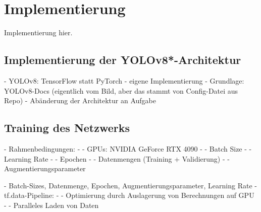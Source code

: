 
\section{Implementierung}
\label{sec:ki:implementierung}

Implementierung hier.


\subsection{Implementierung der YOLOv8*-Architektur}
\label{sec:yolov8_implementierung}

- YOLOv8: TensorFlow statt PyTorch
- eigene Implementierung
- Grundlage: YOLOv8-Docs (eigentlich vom Bild, aber das stammt von Config-Datei aus Repo)
- Abänderung der Architektur an Aufgabe



\subsection{Training des Netzwerks}
\label{sec:training}

- Rahmenbedingungen:
- - GPUs: NVIDIA GeForce RTX 4090
- - Batch Size
- - Learning Rate
- - Epochen
- - Datenmengen (Training + Validierung)
- - Augmentierungsparameter

- Batch-Sizes, Datenmenge, Epochen, Augmentierungsparameter, Learning Rate
- tf.data-Pipeline:
- - Optimierung durch Auslagerung von Berechnungen auf GPU
- - Paralleles Laden von Daten

